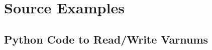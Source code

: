 \chapter{Source Examples}

\section{Python Code to Read/Write Varnums} \label{varnumcode}

\inputminted[linenos, numbersep=5pt, tabsize=4, frame=lines, label=varnum.py]{python}{varnum.py}
